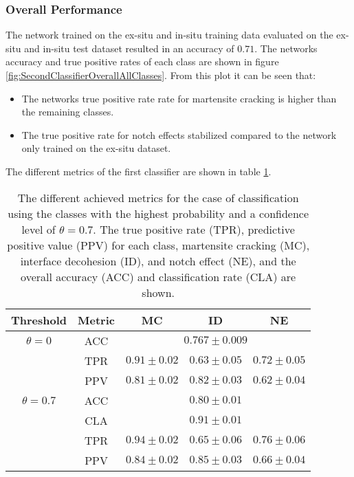 
\subsubsection{Overall Performance}
The network trained on the ex-situ and in-situ training data evaluated on the ex-situ and in-situ test dataset resulted in an accuracy of $0.71$. The networks accuracy and true positive rates of each class are shown in figure \ref{fig:SecondClassifierOverallAllClasses}. From this plot it can be seen that:
\begin{itemize}
\item The networks true positive rate rate for martensite cracking is higher than the remaining classes.
\item The true positive rate for notch effects stabilized compared to the network only trained on the ex-situ dataset. 
\end{itemize}
The different metrics of the first classifier are shown in table \ref{tab:SecondClassifierMetrics}.

\begin{table}[H]
 \begin{center}
  \begin{tabular}{@{} *5c @{}} \toprule[2pt]
   Threshold & Metric &  MC & ID & NE \\ \midrule
   $\theta=0$ & ACC & \multicolumn{3}{c}{$0.767\pm0.009$} \\
   &TPR  & $0.91\pm 0.02$ & $0.63 \pm 0.05 $ & $0.72\pm 0.05$ \\
   &PPV  & $0.81\pm 0.02$ & $0.82\pm 0.03$ & $0.62\pm 0.04$ \\ \midrule
   $\theta=0.7$ & ACC & \multicolumn{3}{c}{ $0.80\pm0.01$} \\
   &CLA  & \multicolumn{3}{c}{ $0.91\pm 0.01$} \\ 
   &TPR  & $0.94\pm 0.02$ & $0.65 \pm 0.06$ & $0.76\pm 0.06$  \\
   &PPV  & $0.84 \pm 0.02$ & $0.85 \pm 0.03$ & $0.66 \pm 0.04$  \\   \bottomrule[2pt]
  \end{tabular}
 \end{center}
 \caption{The different achieved metrics for the case of classification using the classes with the highest probability and a confidence level of $\theta =0.7$. The true positive rate (TPR), predictive positive value (PPV) for each class, martensite cracking (MC), interface decohesion (ID), and notch effect (NE), and the overall accuracy (ACC) and classification rate (CLA) are shown.}
   \label{tab:SecondClassifierMetrics}
\end{table}

